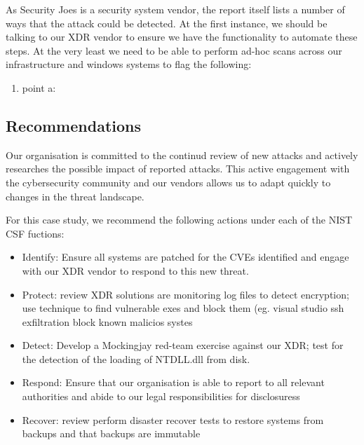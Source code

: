 As Security Joes is a security system vendor, the report itself lists a number of ways that the attack could be detected. At
the first instance, we should be talking to our XDR vendor to ensure we have the functionality to automate these steps.  At
the very least we need to be able to perform ad-hoc scans across our infrastructure and windows systems to flag the following:

\begin{enumerate}
  \item point a:
\end{enumerate}


\subsection{Recommendations}

Our organisation is committed to the continud review of new attacks and actively researches the possible impact of reported attacks.
This active engagement with the cybersecurity community and our vendors allows us to adapt quickly to changes in the threat landscape.

For this case study, we recommend the following actions under each of the NIST CSF fuctions:

\begin{itemize}
\item Identify: Ensure all systems are patched for the CVEs identified and engage with our XDR vendor to respond to this new threat.
\item Protect: review XDR solutions are monitoring log files to detect encryption; use technique to find vulnerable exes and block them (eg. visual studio ssh exfiltration block known malicios systes
\item Detect: Develop a Mockingjay red-team exercise against our XDR; test for the detection of the loading of NTDLL.dll from disk.
\item Respond: Ensure that our organisation is able to report to all relevant authorities  and abide to our legal responsibilities for disclosuress
\item Recover: review perform disaster recover tests to restore systems from backups and that backups are immutable 
\end{itemize}




